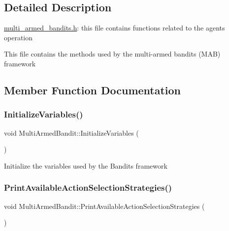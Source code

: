 \subsection{Detailed Description}
\hyperlink{multi__armed__bandits_8h_source}{multi\+\_\+armed\+\_\+bandits.\+h}\+: this file contains functions related to the agents\textquotesingle{} operation


\begin{DoxyItemize}
\item This file contains the methods used by the multi-\/armed bandits (M\+AB) framework 
\end{DoxyItemize}

\subsection{Member Function Documentation}
\mbox{\label{classMultiArmedBandit_af12dc69340c04afff52e3e7fbf00d8d1}} 
\subsubsection{\texorpdfstring{Initialize\+Variables()}{InitializeVariables()}}
{\footnotesize\ttfamily void Multi\+Armed\+Bandit\+::\+Initialize\+Variables (\begin{DoxyParamCaption}{ }\end{DoxyParamCaption})\hspace{0.3cm}{\ttfamily [inline]}}

Initialize the variables used by the Bandits framework \mbox{\label{classMultiArmedBandit_a46bc31936937db05b94710c4699ac150}} 
\subsubsection{\texorpdfstring{Print\+Available\+Action\+Selection\+Strategies()}{PrintAvailableActionSelectionStrategies()}}
{\footnotesize\ttfamily void Multi\+Armed\+Bandit\+::\+Print\+Available\+Action\+Selection\+Strategies (\begin{DoxyParamCaption}{ }\end{DoxyParamCaption})\hspace{0.3cm}{\ttfamily [inline]}}

